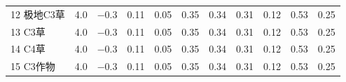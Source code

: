 \begin{landscape}
\begin{table}[htbp]
\begin{tabular}{@{}lcccccccccc@{}}
% 
%
            12 极地C3草 & 4.0 & \num { -0.3 } & 0.11 & 0.05 & 0.35 & 0.34 & 0.31 & 0.12 & 0.53 & 0.25 \\
            13 C3草   & 4.0 & \num { -0.3 } & 0.11 & 0.05 & 0.35 & 0.34 & 0.31 & 0.12 & 0.53 & 0.25   \\
            14 C4草   & 4.0 & \num { -0.3 } & 0.11 & 0.05 & 0.35 & 0.34 & 0.31 & 0.12 & 0.53 & 0.25   \\
            15 C3作物  & 4.0 & \num { -0.3 } & 0.11 & 0.05 & 0.35 & 0.34 & 0.31 & 0.12 & 0.53 & 0.25  \\\bottomrule
        \end{tabular}
\end{table}
\end{landscape}

